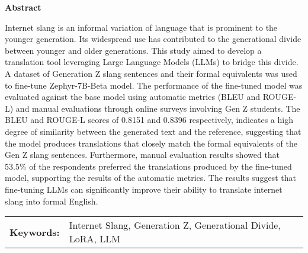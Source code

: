 \begin{center}
\textbf{Abstract}
\end{center}
\setlength{\parindent}{0pt}
Internet slang is an informal variation of language that is prominent to the younger generation. Its widespread use has contributed to the generational divide between younger and older generations. This study aimed to develop a translation tool leveraging Large Language Models (LLMs) to bridge this divide. A dataset of Generation Z slang sentences and their formal equivalents was used to fine-tune Zephyr-7B-Beta model. The performance of the fine-tuned model was evaluated against the base model using automatic metrics (BLEU and ROUGE-L) and manual evaluations through online surveys involving Gen Z students. The BLEU and ROUGE-L scores of 0.8151 and 0.8396 respectively, indicates a high degree of similarity between the generated text and the reference, suggesting that the model produces translations that closely match the formal equivalents of the Gen Z slang sentences. Furthermore, manual evaluation results showed that 53.5\% of the respondents preferred the translations produced by the fine-tuned model, supporting the results of the automatic metrics. The results suggest that fine-tuning LLMs can significantly improve their ability to translate internet slang into formal English. 

\begin{tabular}{lp{4.25in}}
\hspace{-0.5em}\textbf{Keywords:}\hspace{0.25em} & Internet Slang, Generation Z, Generational Divide, LoRA, LLM \\
\end{tabular}
